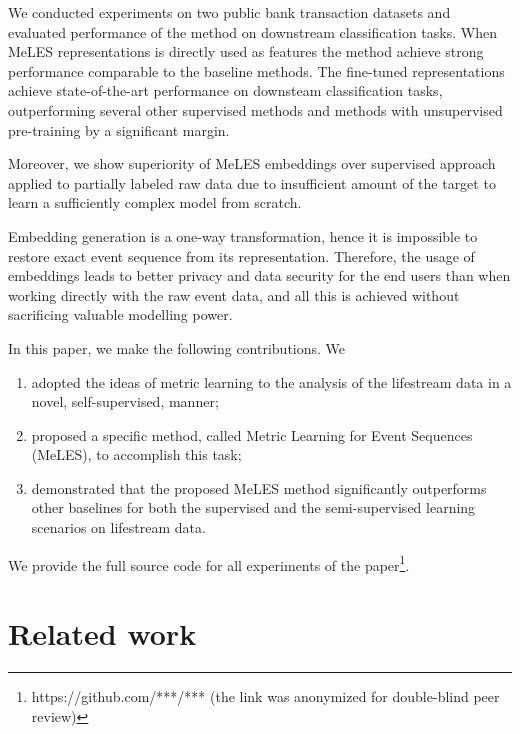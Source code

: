 \documentclass[sigconf, anonymous]{acmart}
\begin{document}


We conducted experiments on two public bank transaction datasets and evaluated performance of the method on downstream classification tasks. When MeLES representations is directly used as features the method achieve strong performance comparable to the baseline methods. The fine-tuned representations achieve state-of-the-art performance on downsteam classification tasks, outperforming several other supervised methods and methods with unsupervised pre-training by a significant margin.

Moreover, we show superiority of MeLES embeddings over supervised approach applied to partially labeled raw data due to insufficient amount of the target to learn a sufficiently complex model from scratch.

Embedding generation is a one-way transformation, hence it is impossible to restore exact event sequence from its representation. Therefore, the usage of embeddings leads to better privacy and data security for the end users than when working directly with the raw event data, and all this is achieved without sacrificing valuable modelling power.

In this paper, we make the following contributions. We
\begin{enumerate}
    \item adopted the ideas of metric learning to the analysis of the lifestream data in a novel, self-supervised, manner;
    \item proposed a specific method, called Metric Learning for Event Sequences (MeLES), to accomplish this task; 
    \item demonstrated that the proposed MeLES method significantly outperforms other baselines for both the supervised and the semi-supervised learning scenarios on lifestream data.
\end{enumerate}

We provide the full source code for all experiments of the paper\footnote{https://github.com/***/*** (the link was anonymized for double-blind peer review)}.

\section{Related work} \label{sec-rel-work}
\end{document}
